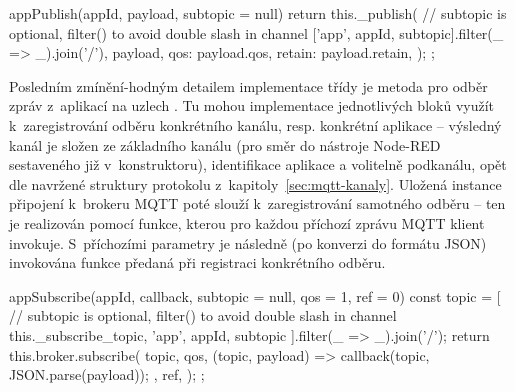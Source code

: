 \begin{code}[
    language=Javascript,
    label=code:fis-node-app-publish,
    caption={Detail z~implementace třídy \ic{FisNode} -- metoda \ic{appPublish} poskytuje možnost konkrétnímu bloku
    odeslání zprávy do odpovídající aplikace na uzlu.}
]
appPublish(appId, payload, subtopic = null) {
    return this._publish(
        // subtopic is optional, filter() to avoid double slash in channel
        ['app', appId, subtopic].filter(_ => _).join('/'),
        {
            payload,
            qos: payload.qos,
            retain: payload.retain,
        }
    );
};
\end{code}

Posledním zmínění-hodným detailem implementace třídy  je metoda pro odběr zpráv z~aplikací na uzlech
.
Tu mohou implementace jednotlivých bloků využít k~zaregistrování odběru konkrétního kanálu, resp. konkrétní aplikace
-- výsledný kanál je složen ze základního kanálu (pro směr do nástroje Node-RED sestaveného již v~konstruktoru),
identifikace aplikace  a volitelně podkanálu, opět dle navržené struktury protokolu z~kapitoly~\ref{sec:mqtt-kanaly}.
Uložená instance připojení k~brokeru MQTT poté slouží k~zaregistrování samotného odběru -- ten je realizován pomocí
funkce, kterou pro každou příchozí zprávu MQTT klient invokuje.
S~příchozími parametry je následně (po konverzi do formátu JSON) invokována funkce předaná při registraci konkrétního
odběru.

\begin{code}[
    language=Javascript,
    label=code:fis-node-app-subscribe,
    caption={Detail z~implementace třídy \ic{FisNode} -- metoda \ic{appSubscribe} je určená k~zaregistrování odběru
    kanálu odpovídajícího konkrétní aplikaci na konkrétním uzlu.
    Parametr \ic{qos} slouží k~nastavení konkrétní hodnoty QoS pro tento odběr, \ic{ref} je volitelná identifikace
    odběru s pomocí které lze mazat konkrétní odběry.}
]
appSubscribe(appId, callback, subtopic = null, qos = 1, ref = 0) {
    const topic = [
        // subtopic is optional, filter() to avoid double slash in channel
        this._subscribe_topic, 'app', appId, subtopic
    ].filter(_ => _).join('/');
    return this.broker.subscribe(
        topic,
        qos,
        (topic, payload) => {
            callback(topic, JSON.parse(payload));
        },
        ref,
    );
};
\end{code}


